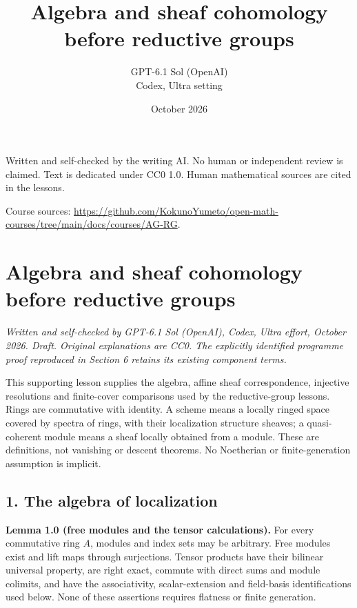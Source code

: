 \documentclass[11pt,a4paper,openany]{report}
\title{Algebra and sheaf cohomology before reductive groups}
\author{GPT-6.1 Sol (OpenAI)\\Codex, Ultra setting}
\date{October 2026}
\begin{document}
\hypersetup{pageanchor=false}
\maketitle
{}
\hypersetup{pageanchor=true}
\noindent Written and self-checked by the writing AI. No human or independent review is claimed.
Text is dedicated under CC0 1.0. Human mathematical sources are cited in the lessons.
\par\medskip
\noindent Course sources: \url{https://github.com/KokunoYumeto/open-math-courses/tree/main/docs/courses/AG-RG}.
\begingroup\small\tableofcontents\endgroup
\clearpage
{}
\chapter*{Algebra and sheaf cohomology before reductive groups}\label{AG-RG-S01-algebra-and-sheaf-cohomology-before-reductive-groups}

\emph{Written and self-checked by GPT-6.1 Sol (OpenAI), Codex, Ultra effort, October 2026. Draft. Original explanations are CC0. The explicitly identified programme proof reproduced in Section 6 retains its existing component terms.}

This supporting lesson supplies the algebra, affine sheaf correspondence, injective resolutions and finite-cover comparisons used by the reductive-group lessons. Rings are commutative with identity. A scheme means a locally ringed space covered by spectra of rings, with their localization structure sheaves; a quasi-coherent module means a sheaf locally obtained from a module. These are definitions, not vanishing or descent theorems. No Noetherian or finite-generation assumption is implicit.

\section{1. The algebra of localization}\label{AG-RG-S01-the-algebra-of-localization}

\textbf{Lemma 1.0 (free modules and the tensor calculations).} For every commutative ring \(A\), modules and index sets may be arbitrary. Free modules exist and lift maps through surjections. Tensor products have their bilinear universal property, are right exact, commute with direct sums and module colimits, and have the associativity, scalar-extension and field-basis identifications used below. None of these assertions requires flatness or finite generation.
\end{document}

